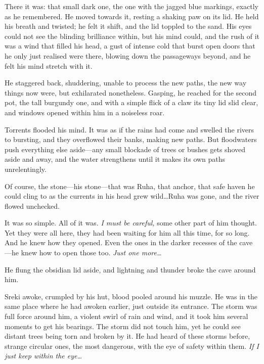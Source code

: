 There it was: that small dark one, the one with the jagged blue markings, exactly as he remembered. He moved towards it, resting a shaking paw on its lid. He held his breath and twisted; he felt it shift, and the lid toppled to the sand. His eyes could not see the blinding brilliance within, but his mind could, and the rush of it was a wind that filled his head, a gust of intense cold that burst open doors that he only just realised were there, blowing down the passageways beyond, and he felt his mind stretch with it.

He staggered back, shuddering, unable to process the new paths, the new way things now were, but exhilarated nonetheless. Gasping, he reached for the second pot, the tall burgundy one, and with a simple flick of a claw its tiny lid slid clear, and windows opened within him in a noiseless roar.

Torrents flooded his mind. It was as if the rains had come and swelled the rivers to bursting, and they overflowed their banks, making new paths. But floodwaters push everything else aside---any small blockade of trees or bushes gets shoved aside and away, and the water strengthens until it makes its own paths unrelentingly.

Of course, the stone---his stone---that was Ruha, that anchor, that safe haven he could cling to as the currents in his head grew wild\ldots{}Ruha was gone, and the river flowed unchecked.

It was so simple. All of it was. \emph{I must be careful,} some other part of him thought. Yet they were all here, they had been waiting for him all this time, for so long. And he knew how they opened. Even the ones in the darker recesses of the cave---he knew how to open those too. \emph{Just one more\ldots{}}

He flung the obsidian lid aside, and lightning and thunder broke the cave around him.

\secdiv

\noindent Sreki awoke, crumpled by his hut, blood pooled around his muzzle. He was in the same place where he had awoken earlier, just outside its entrance. The storm was full force around him, a violent swirl of rain and wind, and it took him several moments to get his bearings. The storm did not touch him, yet he could see distant trees being torn and broken by it. He had heard of these storms before, strange circular ones, the most dangerous, with the eye of safety within them. \emph{If I just keep within the eye\ldots{}}

